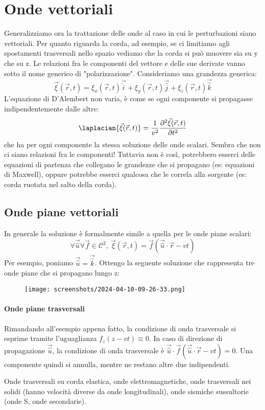 \section{Onde vettoriali}
Generalizziamo ora la trattazione delle onde al caso in cui le perturbazioni siano vettoriali. Per quanto riguarda la corda, ad esempio, se ci limitiamo agli spostamenti trasversali nello spazio vediamo che la corda si può muovere sia su y che su z. Le relazioni fra le componenti del vettore e delle sue derivate vanno sotto il nome generico di "polarizzazione". Consideriamo una grandezza generica:
\begin{equation}
	\vec{\xi}(\vec{r},t)=\xi _x(\vec{r},t) \vec{\hat{i}} + \xi _y(\vec{r},t) \vec{\hat{j}} + \xi _z(\vec{r},t) \vec{\hat{k}} 
\end{equation}
L'equazione di D'Alembert non varia, è come se ogni componente si propagasse indipendentemente dalle altre:
\begin{equation}
	\laplacian{\vec{\xi}(\vec{r},t)}=\frac{1}{v^{2} }\frac{\partial ^{2} \vec{\xi}(\vec{r},t)}{\partial t^{2} }  
\end{equation}
che ha per ogni componente la stessa soluzione delle onde scalari. Sembra che non ci siano relazioni fra le componenti! Tuttavia non è così, potrebbero esserci delle equazioni di partenza che collegano le grandezze che si propagano (es: equazioni di Maxwell), oppure potrebbe esserci qualcosa che le correla alla sorgente (es: corda ruotata nel salto della corda).

\subsection{Onde piane vettoriali}
In generale la soluzione è formalmente simile a quella per le onde piane scalari:
\begin{equation}
	\forall \vec{\hat{u}} \forall \vec{f} \in \mathcal{C} ^{2},\ \vec{\xi}(\vec{r},t) = \vec{f}(\vec{\hat{u}} \cdot \vec{r}-vt)
\end{equation}
Per esempio, poniamo \(\vec{\hat{u}}= \vec{\hat{k}}\). Ottengo la seguente soluzione che rappresenta tre onde piane che si propagano lungo z:
\begin{figure}[H]
	\centering
	\texttt{[image: screenshots/2024-04-10-09-26-33.png]}
\end{figure}

\paragraph{Onde piane trasversali}
Rimandando all'esempio appena fatto, la condizione di onda trasversale si esprime tramite l'uguaglianza \(f_z(z-vt)\equiv 0\). In caso di direzione di propagazione \(\vec{\hat{u}}\), la condizione di onda trasversale è \(\vec{\hat{u}} \cdot \vec{f}(\vec{\hat{u}} \cdot \vec{r}-vt)=0\). Una componente quindi si annulla, mentre ne restano altre due indipendenti.
\begin{eg}
	Onde trasversali su corda elastica, onde elettromagnetiche, onde trasversali nei solidi (hanno velocità diverse da onde longitudinali), onde sismiche sussultorie (onde S, onde secondarie).
\end{eg}

